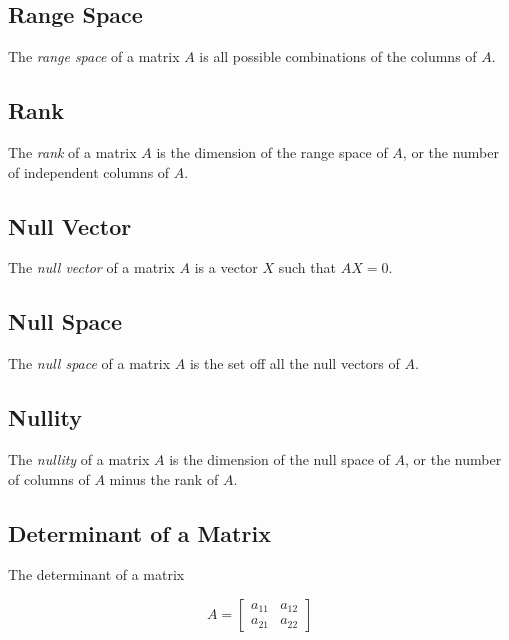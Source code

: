 \subsection{Range Space}

The \textit{range space} of a matrix $A$ is all possible combinations of the
columns of $A$.

\subsection{Rank}

The \textit{rank} of a matrix $A$ is the dimension of the range space of $A$, or
the number of independent columns of $A$.

\subsection{Null Vector}

The \textit{null vector} of a matrix $A$ is a vector $X$ such that $AX=0$.

\subsection{Null Space}

The \textit{null space} of a matrix $A$ is the set off all the null vectors of
$A$.

\subsection{Nullity}

The \textit{nullity} of a matrix $A$ is the dimension of the null space of $A$,
or the number of columns of $A$ minus the rank of $A$.

\subsection{Determinant of a Matrix}

The determinant of a matrix

\begin{equation}
  A =
  \begin{bmatrix}
    a_{11} & a_{12} \\
    a_{21} & a_{22}
  \end{bmatrix}
\end{equation}
